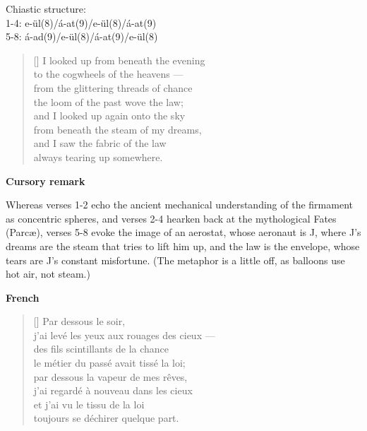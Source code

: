 \documentclass[a4paper,12pt,twoside,final]{book}
\begin{document}

\noindent Chiastic structure: \\
1-4: e-ül(8)/á-at(9)/e-ül(8)/á-at(9) \\
5-8: á-ad(9)/e-ül(8)/á-at(9)/e-ül(8)

\newpage



\settowidth{\versewidth}{from under the steam of my dreams,}

\begin{verse}[\versewidth]
  I looked up from beneath the evening \\
  to the cogwheels of the heavens --- \\
  from the glittering threads of chance \\
  the loom of the past wove the law; \\
  and I looked up again onto the sky \\
  from beneath the steam of my dreams, \\
  and I saw the fabric of the law \\
  always tearing up somewhere. \\
\end{verse}

\bigskip

\noindent \textbf{Cursory remark}

\medskip

Whereas verses 1-2 echo the ancient mechanical understanding of the
firmament as concentric spheres, and verses 2-4 hearken back at the
mythological Fates (Parc\ae), verses 5-8 evoke the image of an
aerostat, whose aeronaut is J, where J's dreams are the steam that
tries to lift him up, and the law is the envelope, whose tears are J's
constant misfortune. (The metaphor is a little off, as balloons use
hot air, not steam.)

\bigskip

\noindent \textbf{French}


\settowidth{\versewidth}{j'ai levé les yeux aux rouages des cieux ---}

\begin{verse}[\versewidth]
  Par dessous le soir, \\
  j'ai levé les yeux aux rouages des cieux --- \\
  des fils scintillants de la chance \\
  le métier du passé avait tissé la loi; \\
  par dessous la vapeur de mes rêves, \\
  j'ai regardé à nouveau dans les cieux \\
  et j'ai vu le tissu de la loi \\
  toujours se déchirer quelque part. \\
\end{verse}
\end{document}

